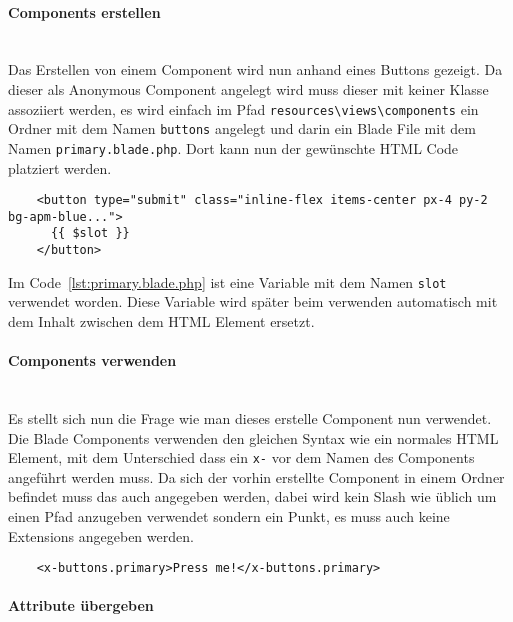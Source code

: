 \paragraph{Components erstellen}\mbox{}\\

Das Erstellen von einem Component wird nun anhand eines Buttons gezeigt. Da
dieser als Anonymous Component angelegt wird muss dieser mit keiner Klasse
assoziiert werden, es wird einfach im Pfad \verb|resources\views\components| ein
Ordner mit dem Namen \verb|buttons| angelegt und darin ein Blade File mit dem
Namen \verb|primary.blade.php|. Dort kann nun der gewünschte HTML Code platziert
werden.

\begin{listing}[H]
  \begin{verbatim}
    <button type="submit" class="inline-flex items-center px-4 py-2 bg-apm-blue...">
      {{ $slot }}
    </button>
  \end{verbatim}
  \caption{primary.blade.php}
  \label{lst:primary.blade.php}
\end{listing}


Im Code~\ref{lst:primary.blade.php} ist eine Variable mit dem Namen \verb|slot|
verwendet worden. Diese Variable wird später beim verwenden automatisch mit dem
Inhalt zwischen dem HTML Element ersetzt.


\paragraph{Components verwenden}\mbox{}\\

Es stellt sich nun die Frage wie man dieses erstelle Component nun verwendet.
Die Blade Components verwenden den gleichen Syntax wie ein normales HTML
Element, mit dem Unterschied dass ein \verb|x-| vor dem Namen des Components
angeführt werden muss. Da sich der vorhin erstellte Component in einem Ordner befindet muss das auch
angegeben werden, dabei wird kein Slash wie üblich um einen Pfad anzugeben
verwendet sondern ein Punkt, es muss auch keine Extensions angegeben werden.

\begin{listing}[H]
  \begin{verbatim}
    <x-buttons.primary>Press me!</x-buttons.primary>
  \end{verbatim}
  \caption{Verwendung eines Button Components}
\end{listing}


\paragraph{Attribute übergeben}\mbox{}\\

